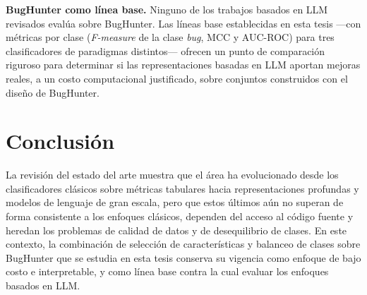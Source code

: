 \textbf{BugHunter como línea base.} Ninguno de los trabajos basados en LLM revisados evalúa sobre BugHunter. Las líneas base establecidas en esta tesis ---con métricas por clase (\textit{F-measure} de la clase \textit{bug}, MCC y AUC-ROC) para tres clasificadores de paradigmas distintos--- ofrecen un punto de comparación riguroso para determinar si las representaciones basadas en LLM aportan mejoras reales, a un costo computacional justificado, sobre conjuntos construidos con el diseño de BugHunter.

\section{Conclusión}
La revisión del estado del arte muestra que el área ha evolucionado desde los clasificadores clásicos sobre métricas tabulares hacia representaciones profundas y modelos de lenguaje de gran escala, pero que estos últimos aún no superan de forma consistente a los enfoques clásicos, dependen del acceso al código fuente y heredan los problemas de calidad de datos y de desequilibrio de clases. En este contexto, la combinación de selección de características y balanceo de clases sobre BugHunter que se estudia en esta tesis conserva su vigencia como enfoque de bajo costo e interpretable, y como línea base contra la cual evaluar los enfoques basados en LLM.

\newpage
